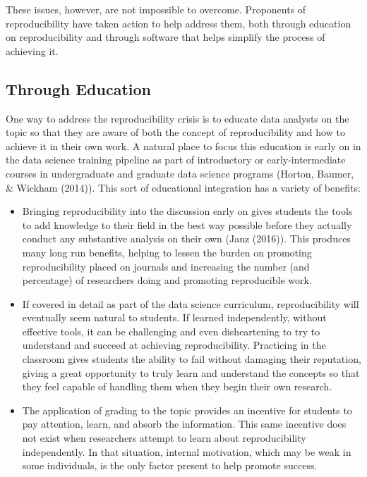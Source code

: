 \documentclass[12pt,twoside]{reedthesis}
\begin{document}
These issues, however, are not impossible to overcome. Proponents of reproducibility have taken action to help address them, both through education on reproducibility and through software that helps simplify the process of achieving it.

\hypertarget{through-education}{%
\subsection{Through Education}\label{through-education}}

One way to address the reproducibility crisis is to educate data analysts on the topic so that they are aware of both the concept of reproducibility and how to achieve it in their own work. A natural place to focus this education is early on in the data science training pipeline as part of introductory or early-intermediate courses in undergraduate and graduate data science programs (Horton, Baumer, \& Wickham (2014)). This sort of educational integration has a variety of benefits:
\begin{itemize}
\item
  Bringing reproducibility into the discussion early on gives students the tools to add knowledge to their field in the best way possible before they actually conduct any substantive analysis on their own (Janz (2016)). This produces many long run benefits, helping to lessen the burden on promoting reproducibility placed on journals and increasing the number (and percentage) of researchers doing and promoting reproducible work.
\item
  If covered in detail as part of the data science curriculum, reproducibility will eventually seem natural to students. If learned independently, without effective tools, it can be challenging and even disheartening to try to understand and succeed at achieving reproducibility. Practicing in the classroom gives students the ability to fail without damaging their reputation, giving a great opportunity to truly learn and understand the concepts so that they feel capable of handling them when they begin their own research.
\item
  The application of grading to the topic provides an incentive for students to pay attention, learn, and absorb the information. This same incentive does not exist when researchers attempt to learn about reproducibility independently. In that situation, internal motivation, which may be weak in some individuals, is the only factor present to help promote success.
\end{itemize}
\end{document}

